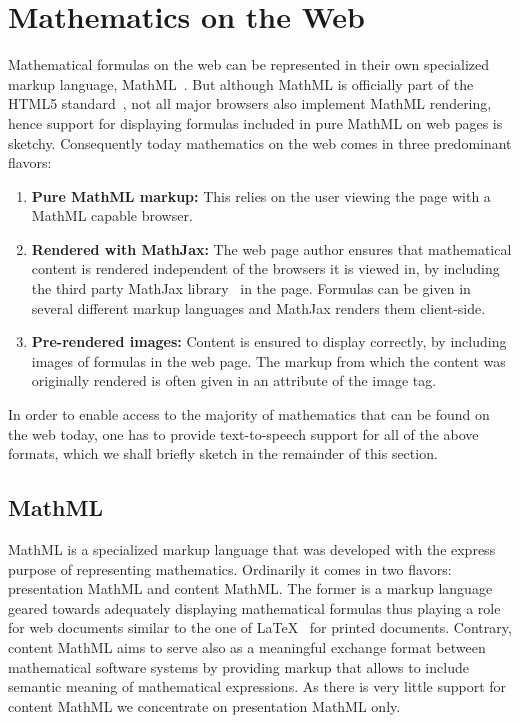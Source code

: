 \documentclass{sig-alternate}
\begin{document}
\section{Mathematics on the Web}
\label{sec:math}

Mathematical formulas on the web can be represented in their own specialized
markup language, MathML~\cite{MathML3}. But although MathML is officially part
of the HTML5 standard~\cite{HTML5}, not all major browsers also implement MathML
rendering, hence support for displaying formulas included in pure MathML on web
pages is sketchy. Consequently today mathematics on the web comes in three
predominant flavors:
\begin{enumerate}
\item \textbf{Pure MathML markup:} This relies on the user viewing the page with
  a MathML capable browser.
\item \textbf{Rendered with MathJax:} The web page author ensures that
  mathematical content is rendered independent of the browsers it is viewed in,
  by including the third party MathJax library~\cite{MathJax2.2} in the
  page. Formulas can be given in several different markup languages and MathJax
  renders them client-side.
\item \textbf{Pre-rendered images:} Content is ensured to display correctly, by
  including images of formulas in the web page. The markup from which the
  content was originally rendered is often given in an attribute of the image
  tag.
\end{enumerate}

In order to enable access to the majority of mathematics that can be found on
the web today, one has to provide text-to-speech support for all of the above
formats, which we shall briefly sketch in the remainder of this section.

\subsection{MathML}
\label{sec:mathml}

MathML is a specialized markup language that was developed with the express
purpose of representing mathematics. Ordinarily it comes in two flavors:
presentation MathML and content MathML. The former is a markup language geared
towards adequately displaying mathematical formulas thus playing a role for web
documents similar to the one of {\LaTeX}~\cite{lamport1986latex} for printed
documents.  Contrary, content MathML aims to serve also as a meaningful exchange
format between mathematical software systems by providing markup that allows to
include semantic meaning of mathematical expressions. As there is very little
support for content MathML we concentrate on presentation MathML only.
  
\end{document}

